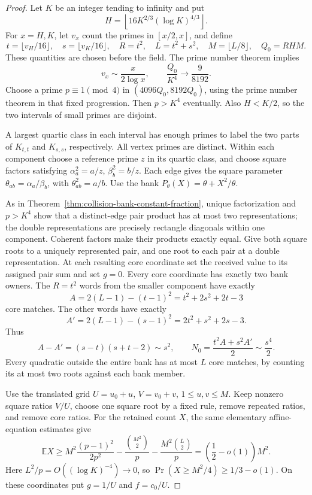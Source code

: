 \begin{proof}
Let $K$ be an integer tending to infinity and put
\[
 H=\left\lfloor16K^{2/3}(\log K)^{4/3}\right\rfloor.
\]
For $x=H,K$, let $v_x$ count the primes in $[x/2,x]$, and define
\[
 t=\lfloor v_H/16\rfloor,\quad s=\lfloor v_K/16\rfloor,
 \quad R=t^2,\quad L=t^2+s^2,\quad
 M=\lfloor L/8\rfloor,\quad Q_0=RHM.
\]
These quantities are chosen before the field.  The prime number theorem
implies
\[
 v_x\sim\frac{x}{2\log x},\qquad
 \frac{Q_0}{K^4}\longrightarrow\frac9{8192}.
\]
Choose a prime $p\equiv1\pmod4$ in $(4096Q_0,8192Q_0)$, using the
prime number theorem in that fixed progression.  Then $p>K^4$
eventually.  Also $H<K/2$, so the two intervals of small primes are
disjoint.

A largest quartic class in each interval has enough primes to label
the two parts of $K_{t,t}$ and $K_{s,s}$, respectively.  All vertex
primes are distinct.  Within each component choose a reference prime
$z$ in its quartic class, and choose square factors satisfying
$\alpha_a^2=a/z$, $\beta_b^2=b/z$.  Each edge gives the square
parameter $\theta_{ab}=\alpha_a/\beta_b$, with $\theta_{ab}^2=a/b$.
Use the bank $P_\theta(X)=\theta+X^2/\theta$.

As in Theorem~\ref{thm:collision-bank-constant-fraction}, unique
factorization and $p>K^4$ show that a distinct-edge pair product has
at most two representations; the double representations are precisely
rectangle diagonals within one component.  Coherent factors make their
products exactly equal.  Give both square roots to a uniquely
represented pair, and one root to each pair at a double representation.
At each resulting core coordinate set the received value to its assigned
pair sum and set $g=0$.  Every core coordinate has exactly two bank
owners.  The $R=t^2$ words from the smaller component have exactly
\[
 A=2(L-1)-(t-1)^2=t^2+2s^2+2t-3
\]
core matches.  The other words have exactly
\[
 A'=2(L-1)-(s-1)^2=2t^2+s^2+2s-3.
\]
Thus
\[
 A-A'=(s-t)(s+t-2)\sim s^2,\qquad
 N_0=\frac{t^2 A+s^2 A'}2\sim\frac{s^4}2.
\]
Every quadratic outside the entire bank has at most $L$ core matches,
by counting its at most two roots against each bank member.

Use the translated grid $U=u_0+u$, $V=v_0+v$, $1\le u,v\le M$.
Keep nonzero square ratios $V/U$, choose one square root by a fixed
rule, remove repeated ratios, and remove core ratios.  For the retained
count $X$, the same elementary affine-equation estimates give
\[
 \mathbb E X\ge M^2\frac{(p-1)^2}{2p^2}
 -\frac{\binom{M^2}{2}}p-\frac{M^2\binom L2}p
 =\left(\frac12-o(1)\right)M^2.
\]
Here $L^2/p=O((\log K)^{-4})\to0$, so
$\Pr(X\ge M^2/4)\ge1/3-o(1)$.
On these coordinates put $g=1/U$ and $f=c_0/U$.


\end{proof}
